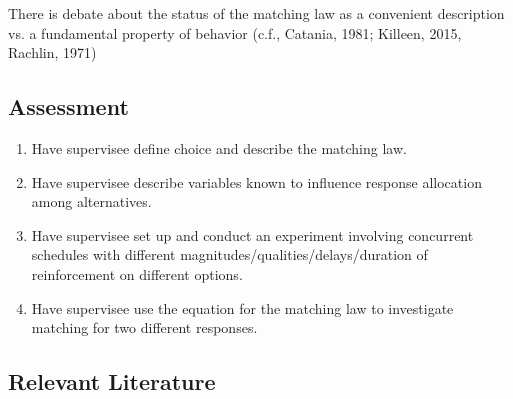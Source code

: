 There is debate about the status of the matching law as a convenient description vs. a fundamental property of behavior (c.f., Catania, 1981; Killeen, 2015, Rachlin, 1971)
%
\subsection{Assessment}
\begin{enumerate}
\item Have supervisee define choice and describe the matching law.
\item Have supervisee describe variables known to influence response allocation among alternatives.
\item Have supervisee set up and conduct an experiment involving concurrent schedules with different magnitudes/qualities/delays/duration of reinforcement on different options.
\item Have supervisee use the equation for the matching law to investigate matching for two different responses.
%
\end{enumerate}
%
\subsection{Relevant Literature}
\begin{refsection}
\nocite{test,alang2017police,clayton2018black}
\printbibliography[heading=none]
\end{refsection}
%
